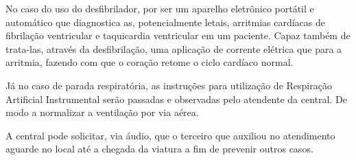 No caso do uso do desfibrilador, por ser um aparelho eletrônico portátil e automático que diagnostica as, potencialmente letais, arritmias cardíacas de fibrilação ventricular e taquicardia ventricular em um paciente. Capaz também de trata-las, através da desfibrilação, uma aplicação de corrente elétrica que para a arritmia, fazendo com que o coração retome o ciclo cardíaco normal.

Já no caso de parada respiratória, as instruções para utilização de Respiração Artificial Instrumental serão passadas e observadas pelo atendente da central. De modo a normalizar a ventilação por via aérea.

A central pode solicitar, via áudio, que o terceiro que auxiliou no atendimento aguarde no local até a chegada da viatura a fim de prevenir outros casos.

